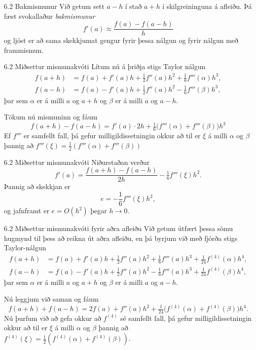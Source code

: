 \begin{frame}{6.2 Bakmismunur} 
Við getum sett $a-h$ í stað $a+h$ í skilgreininguna á afleiðu.
Þá fæst svokallaður {\em bakmismunur}
\begin{equation*}
  f'(a) \approx \frac{f(a)-f(a-h)}{h}
\end{equation*}
og ljóst er að sama skekkjumat gengur fyrir þessa nálgun
og fyrir nálgun með frammismun.
\end{frame}


\begin{frame}{6.2 Miðsettur mismunakvóti} 
Lítum nú á þriðja stigs Taylor nálgun 
\begin{align*}
  f(a+h)&=f(a)+f'(a)h+\tfrac 12 f''(a)h^2+\tfrac 16 f'''(\alpha)h^3,\\
  f(a-h)&=f(a)-f'(a)h+\tfrac 12 f''(a)h^2-\tfrac 16 f'''(\beta)h^3,
\end{align*}
þar sem $\alpha$ er á milli $a$ og $a+h$ og $\beta$ er á milli $a$ og
$a-h$.  

\pause
Tökum nú mismuninn og fáum
$$
f(a+h)-f(a-h)=f'(a)\cdot 2h+\tfrac 16\big(f'''(\alpha)+f'''(\beta)\big)h^3
$$
Ef  $f'''$ er samfellt fall, þá gefur
milligildis\-setningin okkur að til er $\xi$ á milli $\alpha$ og $\beta$
þannig að $f'''(\xi)=\tfrac 12 (f'''(\alpha)+f'''(\beta))$ 
\end{frame}


\begin{frame}{6.2 Miðsettur mismunakvóti} 
Niðurstaðan verður 
$$
  f'(a)=\dfrac{f(a+h)-f(a-h)}{2h}-\tfrac 16f'''(\xi)h^2.
$$
Þannig að skekkjan er 
$$
  e = -\frac 16 f'''(\xi) h^2,
$$
og jafnframt er $e = O(h^2)$ þegar $h\to 0$.
\end{frame}


\begin{frame}{6.2 Miðsettur mismunakvóti fyrir aðra afleiðu} 
Við getum útfært þessa sömu hugmynd til þess að reikna út aðra
afleiðu, en þá byrjum við með fjórða stigs Taylor-nálgun 
\begin{align*}
  f(a+h)&=f(a)+f'(a)h+\tfrac 12 f''(a)h^2+\tfrac 16 f'''(a)h^3
+\tfrac 1{24}f^{(4)}(\alpha)h^4,\\
  f(a-h)&=f(a)-f'(a)h+\tfrac 12 f''(a)h^2-\tfrac 16 f'''(a)h^3
+\tfrac 1{24}f^{(4)}(\beta)h^4,
\end{align*}
þar sem $\alpha$ er á milli $a$ og $a+h$ og $\beta$ er á milli $a$ og
$a-h$.  

\pause
\smallskip
Nú leggjum við saman og fáum
$$
f(a+h)+f(a-h)=2f(a) +f''(a)h^2+\tfrac
1{24}\big(f^{(4)}(\alpha)+f^{(4)}(\beta)\big)h^4.
$$
Nú þurfum við að gefa okkur að $f^{(4)}$ sé samfellt fall, þá gefur
milligildissetningin okkur að til er $\xi$ á milli $\alpha$ og $\beta$
þannig að $f^{(4)}(\xi)=\tfrac 12 (f^{(4)}(\alpha)+f^{(4)}(\beta))$. 
\end{frame}


